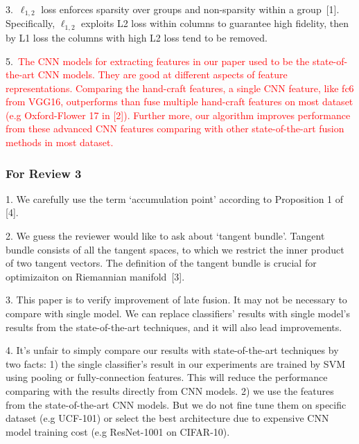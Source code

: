 \documentclass[letterpaper]{article}
\def\yanred{\textcolor{red}}
\def\yanred{\textcolor{red}}
\begin{document}
3.~$\ell_{1, 2}$ loss enforces sparsity over groups and non-sparsity within a group~[1].
Specifically, $\ell_{1, 2}$ exploits L2 loss within columns to guarantee high fidelity,
then by L1 loss the columns with high L2 loss tend to be removed.

5.~\yanred{The CNN models for extracting features in our paper used to be the state-of-the-art CNN models.
They are good at different aspects of feature representations.
Comparing the hand-craft features, a single CNN feature, like fc6 from VGG16, outperforms than fuse multiple hand-craft features on most dataset (e.g Oxford-Flower 17 in [2]).
Further more, our algorithm improves performance from these advanced CNN features comparing with other state-of-the-art fusion methods in most dataset.}


\subsubsection{For Review 3}

1. We carefully use the term `accumulation point' according to Proposition 1 of [4].

2. We guess the reviewer would like to ask about `tangent bundle'.
Tangent bundle consists of all the tangent spaces, 
to which we restrict the inner product of two tangent vectors.
The definition of the tangent bundle is crucial for optimizaiton on Riemannian manifold~[3].

3. This paper is to verify improvement of late fusion.
It may not be necessary to compare with single model.
We can replace classifiers' results with single model's results from the state-of-the-art techniques, and it will also lead improvements.

4. It's unfair to simply compare our results with state-of-the-art techniques by two facts:
1) the single classifier's result in our experiments are trained by SVM using pooling or fully-connection features.
This will reduce the performance comparing with the results directly from CNN models.
2) we use the features from the state-of-the-art CNN models.
But we do not fine tune them on specific dataset (e.g UCF-101) or select the best architecture due to expensive CNN model training cost (e.g ResNet-1001 on CIFAR-10).
\end{document}

